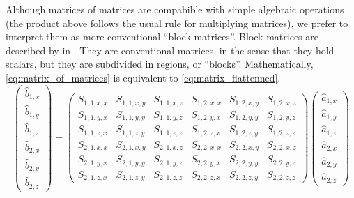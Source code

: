 Although matrices of matrices are compabible with simple algebraic operations (the product above follows the usual rule for multiplying matrices), we prefer to interpret them as more conventional ``block matrices''.
Block matrices are described by \citeauthor{eves2012elementary} in  \cite{eves2012elementary}.
They are conventional matrices, in the sense that they hold scalars, but they are subdivided in regions, or ``blocks''.
Mathematically, \cref{eq:matrix_of_matrices} is equivalent to \cref{eq:matrix_flattenned}.
\begin{equation}
    \begin{pmatrix}
        \hat{b}_{1, x} \\ \hat{b}_{1, y} \\ \hat{b}_{1, z}
        \\
        \hat{b}_{2, x} \\ \hat{b}_{2, y} \\ \hat{b}_{2, z}
    \end{pmatrix}
    =
    \begin{pmatrix}
        S_{1, 1, x, x} & S_{1, 1, x, y} & S_{1, 1, x, z}   &   S_{1, 2, x, x} & S_{1, 2, x, y} & S_{1, 2, x, z} \\
        S_{1, 1, y, x} & S_{1, 1, y, y} & S_{1, 1, y, z}   &   S_{1, 2, y, x} & S_{1, 2, y, y} & S_{1, 2, y, z} \\
        S_{1, 1, z, x} & S_{1, 1, z, y} & S_{1, 1, z, z}   &   S_{1, 2, z, x} & S_{1, 2, z, y} & S_{1, 2, z, z} \\
        S_{2, 1, x, x} & S_{2, 1, x, y} & S_{2, 1, x, z}   &   S_{2, 2, x, x} & S_{2, 2, x, y} & S_{2, 2, x, z} \\
        S_{2, 1, y, x} & S_{2, 1, y, y} & S_{2, 1, y, z}   &   S_{2, 2, y, x} & S_{2, 2, y, y} & S_{2, 2, y, z} \\
        S_{2, 1, z, x} & S_{2, 1, z, y} & S_{2, 1, z, z}   &   S_{2, 2, z, x} & S_{2, 2, z, y} & S_{2, 2, z, z}
    \end{pmatrix}
    \begin{pmatrix}
        \hat{a}_{1, x} \\ \hat{a}_{1, y} \\ \hat{a}_{1, z}
        \\
        \hat{a}_{2, x} \\ \hat{a}_{2, y} \\ \hat{a}_{2, z}
    \end{pmatrix}
    \label{eq:matrix_flattenned}
\end{equation}

